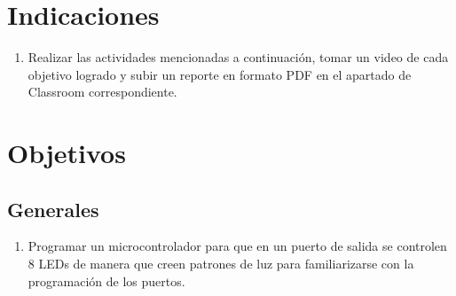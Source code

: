 \documentclass[11pt,letterpaper]{article}
\begin{document}
\section{Indicaciones}
\begin{enumerate}[label=(\roman*)]
    \item Realizar las actividades mencionadas a continuación, tomar un video de cada objetivo logrado y subir un reporte en formato PDF en el apartado de Classroom correspondiente.
\end{enumerate}
\section{Objetivos}
\subsection{Generales}
\begin{enumerate}[label=\arabic*)]
    \item Programar un microcontrolador para que en un puerto de salida se controlen 8 LEDs de manera que creen patrones de luz para familiarizarse con la programación de los puertos.
\end{enumerate}
\end{document}
